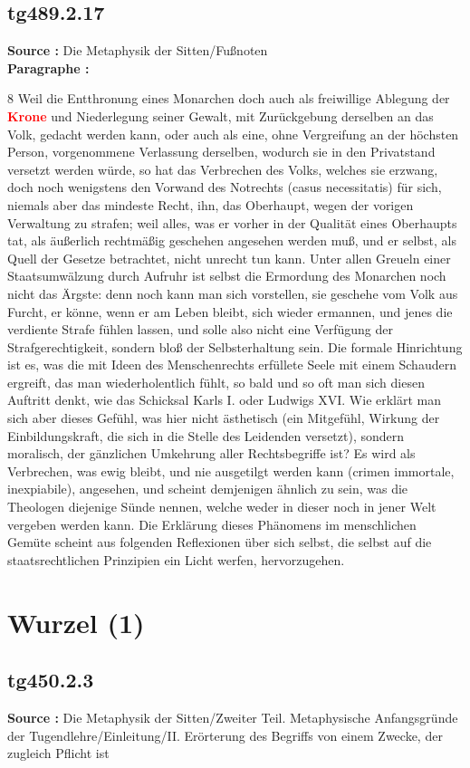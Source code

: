 \documentclass[a4paper,12pt,twoside]{book}
\newcommand{\match}[1]{\textcolor{red}{\textbf{#1}}}
\newcommand{\unnumberedsection}[1]{
	\section*{#1}
	\addcontentsline{toc}{section}{#1}
	\markright{#1}
}
\begin{document}
	\subsection*{tg489.2.17} 
	\textbf{Source : }Die Metaphysik der Sitten/Fußnoten\\  
	
	\textbf{Paragraphe : }
	
	8 Weil die Entthronung eines Monarchen doch auch als freiwillige Ablegung der \match{Krone} und Niederlegung seiner Gewalt, mit Zurückgebung derselben an das Volk, gedacht werden kann, oder auch als eine, ohne Vergreifung an der höchsten Person, vorgenommene Verlassung derselben, wodurch sie in den Privatstand versetzt werden würde, so hat das Verbrechen des Volks, welches sie erzwang, doch noch wenigstens den Vorwand des Notrechts (casus necessitatis) für sich, niemals aber das mindeste Recht, ihn, das Oberhaupt, wegen der vorigen Verwaltung zu strafen; weil alles, was er vorher in der Qualität eines Oberhaupts tat, als äußerlich rechtmäßig geschehen angesehen werden muß, und er selbst, als Quell der Gesetze betrachtet, nicht unrecht tun kann. Unter allen Greueln einer Staatsumwälzung durch Aufruhr ist selbst die Ermordung des Monarchen noch nicht das Ärgste: denn noch kann man sich vorstellen, sie geschehe vom Volk aus Furcht, er könne, wenn er am Leben bleibt, sich wieder ermannen, und jenes die verdiente Strafe fühlen lassen, und solle also nicht eine Verfügung der Strafgerechtigkeit, sondern bloß der Selbsterhaltung sein. Die formale Hinrichtung ist es, was die mit Ideen des Menschenrechts erfüllete Seele mit einem Schaudern ergreift, das man wiederholentlich fühlt, so bald und so oft man sich diesen Auftritt denkt, wie das Schicksal Karls I. oder Ludwigs XVI. Wie erklärt man sich aber dieses Gefühl, was hier nicht ästhetisch (ein Mitgefühl, Wirkung der Einbildungskraft, die sich in die Stelle des Leidenden versetzt), sondern moralisch, der gänzlichen Umkehrung aller Rechtsbegriffe ist? Es wird als Verbrechen, was ewig bleibt, und nie ausgetilgt werden kann (crimen immortale, inexpiabile), angesehen, und scheint demjenigen ähnlich zu sein, was die Theologen diejenige Sünde nennen, welche weder in dieser noch in jener Welt vergeben werden kann. Die Erklärung dieses Phänomens im menschlichen Gemüte scheint aus folgenden Reflexionen über sich selbst, die selbst auf die staatsrechtlichen Prinzipien ein Licht werfen, hervorzugehen. 
	
	\unnumberedsection{Wurzel (1)} 
	\subsection*{tg450.2.3} 
	\textbf{Source : }Die Metaphysik der Sitten/Zweiter Teil. Metaphysische Anfangsgründe der Tugendlehre/Einleitung/II. Erörterung des Begriffs von einem Zwecke, der zugleich Pflicht ist\\  
	
\end{document}
